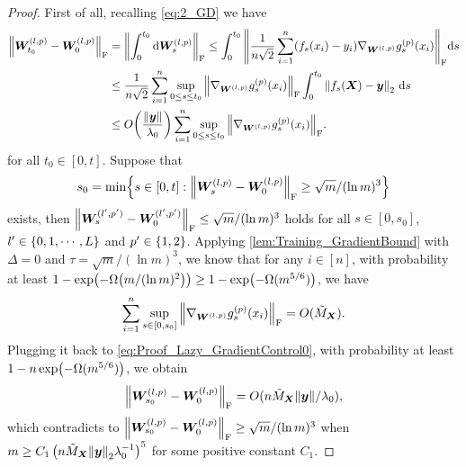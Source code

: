 \begin{proof}
  First of all, recalling \cref{eq:2_GD} we have
  \begin{align}
    \notag
    \norm{\bm{W}^{(l,p)}_{t_0} - \bm{W}^{(l,p)}_0}_{\mr{F}}&= \norm{\int^{t_0}_0 {\dd \bm{W}^{(l,p)}_s}}_{\mr{F}} \leq  \int^{t_0}_0 \norm{\frac{1}{n\sqrt{2}}\sum^n_{i=1} ( f_s(\x_i) - y_i) \nabla_{\bm{W}^{(l,p)}} g^{(p)}_s(\x_i)}_{\mr{F}}\dd s \\
    \notag
    &\leq \frac{1}{n\sqrt{2}} \sum^n_{i=1} \sup_{0\leq s \leq t_0}\norm{\nabla_{\bm{W}^{(l,p)}} g_s^{(p)}(\x_i)}_{\mr{F}} \int^{t_0}_0 \norm{f_s(\X)-\bm{y}}_2~\dd s \\
    \label{eq:Proof_Lazy_GradientControl0}
    &\leq  O\xkm{\frac{\norm{\bm{y}}}{\lambda_0}} \sum^n_{i=1}\sup_{0\leq s \leq t_0} \norm{\nabla_{\bm{W}^{(l,p)}} g_s^{(p)}(\x_i)}_{\mr{F}} .
  \end{align}
  for all $t_0\in[0,t]$.
  Suppose that \[s_0 = \min\dkm{ s \in [0,t]:\norm{\bm{W}^{(l,p)}_s- \bm{W}^{(l,p)}_0}_{\mr{F}} \geq  {\sqrt{m}}/{(\ln m)^3}}\] exists,
  then $\norm{\bm{W}^{(l',p')}_s - \bm{W}^{(l',p')}_0}_{\mathrm{F}} \leq {\sqrt{m}}/{(\ln m)^3}$ holds for all $s \in [0,s_0] $, $l'\in \left\{0,1,\cdots,L\right\}$ and $p'\in\left\{1,2\right\}$.
  Applying \cref{lem:Training_GradientBound} with $\Delta=0$ and $\tau={\sqrt{m}}/{(\ln m)^3}$, we know that for any $i\in[n]$, with probability at least $1-\exp\xkm{-\Omega\xkm{m/(\ln m)^{2}}}\geq 1-\exp\xkm{-\Omega(m^{5/6})}$, we have
  \begin{equation*}
    \sum_{i=1}^n\sup_{s \in [0,s_0]} \norm{\nabla_{ \bm{W}^{(l,p)}} g_s^{(p)}(x_i)}_{\mathrm{F}} = O(\tilde{M}_{\bm{X}}).
  \end{equation*}
  Plugging it back to \cref{eq:Proof_Lazy_GradientControl0}, with probability at least $1-n\exp\xkm{-\Omega(m^{5/6})}$, we obtain
  \[\norm{\bm{W}^{(l,p)}_{s_0} - \bm{W}^{(l,p)}_0}_{\mathrm{F}} =  O({n \tilde{M}_{\bm{X}} \norm{\bm{y}}}/{\lambda_0}),\]
  which contradicts to $\norm{\bm{W}^{(l,p)}_{s_0}- \bm{W}^{(l,p)}_0}_{\mathrm{F}}  \geq {\sqrt{m}}/{(\ln m)^3}$ when $m\geq C_1\left(n\tilde{M}_{\bm{X}}\norm{\bm{y}}_2\lambda_0^{-1}\right)^5$ for some positive constant $C_1$.


\end{proof}
